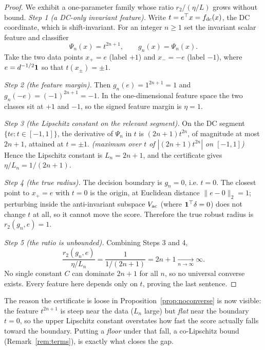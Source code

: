 \begin{proof}
We exhibit a one-parameter family whose ratio $r_2/(\eta/L)$ grows without bound.
\emph{Step 1 (a DC-only invariant feature).}
Write $t = e^\top x = f_{\mathrm{dc}}(x)$, the DC coordinate, which is shift-invariant. For an integer
$n \ge 1$ set the invariant scalar feature and classifier
\[
\Psi_n(x) = t^{2n+1}, \qquad g_n(x) = \Psi_n(x).
\]
Take the two data points $x_+ = e$ (label $+1$) and $x_- = -e$ (label $-1$), where $e = d^{-1/2}\mathbf 1$
so that $t(x_\pm) = \pm 1$.

\emph{Step 2 (the feature margin).}
Then $g_n(e) = 1^{2n+1} = 1$ and $g_n(-e) = (-1)^{2n+1} = -1$. In the one-dimensional feature space
the two classes sit at $+1$ and $-1$, so the signed feature margin is $\eta = 1$.

\emph{Step 3 (the Lipschitz constant on the relevant segment).}
On the DC segment $\{t e : t \in [-1,1]\}$, the derivative of $\Psi_n$ in $t$ is $(2n+1)t^{2n}$, of
magnitude at most $2n+1$, attained at $t = \pm 1$. \emph{(maximum over $t$ of $|(2n+1)t^{2n}|$ on
$[-1,1]$)} Hence the Lipschitz constant is $L_n = 2n+1$, and the certificate gives
$\eta/L_n = 1/(2n+1)$.

\emph{Step 4 (the true radius).}
The decision boundary is $g_n = 0$, i.e. $t = 0$. The closest point to $x_+ = e$ with $t = 0$ is the
origin, at Euclidean distance $\|e - 0\|_2 = 1$; perturbing inside the anti-invariant subspace $V_{\mathrm{ac}}$
(where $\mathbf 1^\top\delta = 0$) does not change $t$ at all, so it cannot move the score. Therefore the
true robust radius is $r_2(g_n, e) = 1$.

\emph{Step 5 (the ratio is unbounded).}
Combining Steps 3 and 4,
\[
\frac{r_2(g_n, e)}{\eta/L_n} = \frac{1}{1/(2n+1)} = 2n+1 \xrightarrow[n\to\infty]{} \infty.
\]
No single constant $C$ can dominate $2n+1$ for all $n$, so no universal converse exists. Every
feature here depends only on $t$, proving the last sentence.
\end{proof}

The reason the certificate is loose in Proposition~\ref{prop:noconverse} is now visible: the feature
$t^{2n+1}$ is steep near the data ($L_n$ large) but \emph{flat} near the boundary $t=0$, so the
upper Lipschitz constant overstates how fast the score actually falls toward the boundary. Putting a
\emph{floor} under that fall, a co-Lipschitz bound (Remark~\ref{rem:terms}), is exactly what closes
the gap.


